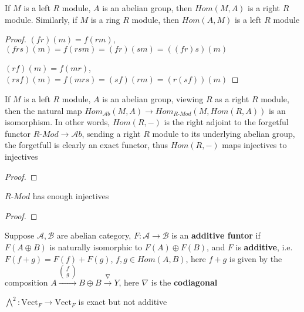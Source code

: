 \documentclass[../main.tex]{subfiles}
\begin{document}
\begin{lemma}
If $M$ is a left $R$ module, $A$ is an abelian group, then $Hom(M,A)$ is a right $R$ module. Similarly, if $M$ is a ring $R$ module, then $Hom(A,M)$ is a left $R$ module
\end{lemma}

\begin{proof}
$(fr)(m)=f(rm)$, $(frs)(m)=f(rsm)=(fr)(sm)=((fr)s)(m)$ \par
$(rf)(m)=f(mr)$, $(rsf)(m)=f(mrs)=(sf)(rm)=(r(sf))(m)$
\end{proof}

\begin{proposition}
If $M$ is a left $R$ module, $A$ is an abelian group, viewing $R$ as a right $R$ module, then the natural map $Hom_{\mathscr Ab}(M,A)\to Hom_{R\text{-}Mod}(M,Hom(R,A))$ is an isomorphism. In other words, $Hom(R,-)$ is the right adjoint to the forgetful functor $R$-$Mod\to \mathscr Ab$, sending a right $R$ module to its underlying abelian group, the forgetfull is clearly an exact functor, thus $Hom(R,-)$ maps injectives to injectives
\end{proposition}

\begin{proof}

\end{proof}

\begin{corollary}
 $R$-$Mod$ has enough injectives
\end{corollary}

\begin{proof}

\end{proof}

\begin{definition}
Suppose $\mathscr A,\mathscr B$ are abelian category, $F:\mathscr A\to \mathscr B$ is an \textbf{additive funtor} if $F(A\oplus B)$ is naturally isomorphic to $F(A)\oplus F(B)$, and $F$ is \textbf{additive}, i.e. $F(f+g)=F(f)+F(g)$, $f,g\in Hom(A,B)$, here $f+g$ is given by the composition $A\xrightarrow{\begin{pmatrix}
f \\ g
\end{pmatrix}} B\oplus B\xrightarrow{\nabla}Y$, here $\nabla$ is the \textbf{codiagonal}
\end{definition}

\begin{example}
$\bigwedge^2:\mathrm{Vect}_F\to\mathrm{Vect}_F$ is exact but not additive
\end{example}
\end{document}
